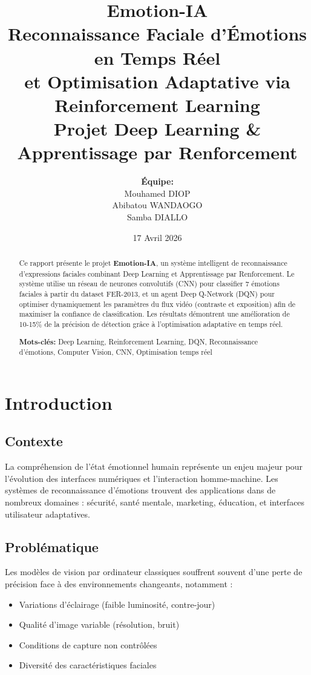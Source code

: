 \documentclass[12pt,a4paper]{article}
\title{
    \vspace{-2cm}
    \textbf{\Huge Emotion-IA}\\[0.5cm]
    \Large Reconnaissance Faciale d'Émotions en Temps Réel\\
    et Optimisation Adaptative via Reinforcement Learning\\[1cm]
    \large Projet Deep Learning \& Apprentissage par Renforcement
}
\author{
    \textbf{Équipe:}\\[0.3cm]
    Mouhamed DIOP\\
    Abibatou WANDAOGO\\
    Samba DIALLO\\[1cm]
}
\date{17 Avril 2026}
\begin{document}
\maketitle
\thispagestyle{empty}
\newpage

\tableofcontents
\newpage

\begin{abstract}
Ce rapport présente le projet \textbf{Emotion-IA}, un système intelligent de reconnaissance d'expressions faciales combinant Deep Learning et Apprentissage par Renforcement. Le système utilise un réseau de neurones convolutifs (CNN) pour classifier 7 émotions faciales à partir du dataset FER-2013, et un agent Deep Q-Network (DQN) pour optimiser dynamiquement les paramètres du flux vidéo (contraste et exposition) afin de maximiser la confiance de classification. Les résultats démontrent une amélioration de 10-15\% de la précision de détection grâce à l'optimisation adaptative en temps réel.

\textbf{Mots-clés:} Deep Learning, Reinforcement Learning, DQN, Reconnaissance d'émotions, Computer Vision, CNN, Optimisation temps réel
\end{abstract}

\newpage

\section{Introduction}

\subsection{Contexte}
La compréhension de l'état émotionnel humain représente un enjeu majeur pour l'évolution des interfaces numériques et l'interaction homme-machine. Les systèmes de reconnaissance d'émotions trouvent des applications dans de nombreux domaines : sécurité, santé mentale, marketing, éducation, et interfaces utilisateur adaptatives.

\subsection{Problématique}
Les modèles de vision par ordinateur classiques souffrent souvent d'une perte de précision face à des environnements changeants, notamment :
\begin{itemize}
    \item Variations d'éclairage (faible luminosité, contre-jour)
    \item Qualité d'image variable (résolution, bruit)
    \item Conditions de capture non contrôlées
    \item Diversité des caractéristiques faciales
\end{itemize}
\end{document}
